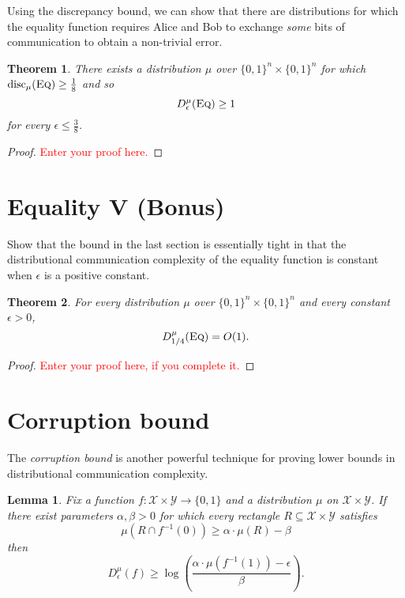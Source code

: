 \documentclass[11pt]{amsart}
\theoremstyle{plain}
\newtheorem{theorem}{Theorem}
\newtheorem{lemma}{Lemma}
\theoremstyle{definition}
\theoremstyle{plain}
\newcommand{\calX}{\mathcal{X}}
\newcommand{\calY}{\mathcal{Y}}
\newcommand{\disc}{\mathrm{disc}}
\newcommand{\Eq}{\textsc{Eq}}
\newcommand{\replacethistext}[1]{\textcolor{red}{#1}}
\begin{document}
Using the discrepancy bound, we can show that there are distributions for which the equality function requires Alice and Bob to exchange \emph{some} bits of communication to obtain a non-trivial error.

\begin{theorem}
There exists a distribution $\mu$ over $\{0,1\}^n \times \{0,1\}^n$ for which 
$
\disc_\mu(\Eq) \ge \frac18
$
and so
\[
D^\mu_\epsilon(\Eq) \ge 1
\]
for every $\epsilon \le \frac38$.
\end{theorem}

\begin{proof}
\replacethistext{Enter your proof here.}
\end{proof}



\newpage \section{Equality V (Bonus)}

Show that the bound in the last section is essentially tight in that the distributional communication complexity of the equality function is constant when $\epsilon$ is a positive constant.

\begin{theorem}
For every distribution $\mu$ over $\{0,1\}^n \times \{0,1\}^n$ and every constant $\epsilon > 0$,
\[
D^\mu_{1/4}(\Eq) = O(1).
\]
\end{theorem}

\begin{proof}
\replacethistext{Enter your proof here, if you complete it.}
\end{proof}



\newpage \section{Corruption bound}

The \emph{corruption bound} is another powerful technique for proving lower bounds in distributional communication complexity.

\begin{lemma}
Fix a function $f : \calX \times \calY \to \{0,1\}$ and a distribution
$\mu$ on $\calX \times \calY$.
If there exist parameters $\alpha, \beta > 0$ for which
every rectangle $R \subseteq \calX \times \calY$ satisfies 
\[
\mu(R \cap f^{-1}(0)) \ge \alpha \cdot \mu(R) - \beta
\]
then
\[
D^\mu_\epsilon(f) \ge \log\left( \frac{\alpha \cdot \mu(f^{-1}(1)) - \epsilon}{\beta}\right).
\]
\end{lemma}
\end{document}
